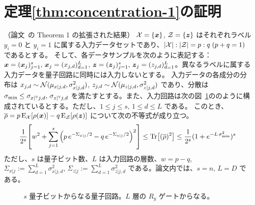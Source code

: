 \section{定理\ref{thm:concentration-1}の証明}\label{sec:prf-concentration-1}
\begin{screen}
    \begin{theorem}
        （論文~\cite{li2022concentration}の Theorem 1 の拡張された結果）
        $\mathcal{X} = \{\boldsymbol{x}\}$, $\mathcal{Z} = \{\boldsymbol{z}\}$ はそれぞれラベル $y_i=0$ と $y_i=1$ に属する入力データセットであり、$|\mathcal{X}|:|\mathcal{Z}| = p:q\;(p+q=1)$ であるとする。
        そして、各データサンプルを次のように表記する：$\boldsymbol{x} = (\boldsymbol{x}_{j})_{j=1}^s,\, \boldsymbol{x}_{j} = (x_{j,d})_{d=1}^L$, $\boldsymbol{z} = (\boldsymbol{z}_{j})_{j=1}^s,\, \boldsymbol{z}_{j} = (z_{j,d})_{d=1}^L$。異なるラベルに属する入力データを量子回路に同時には入力しないとする。
        入力データの各成分の分布は $x_{j,d} \sim \mathcal{N}(\mu_{x|j,d}, \sigma_{x|j,d}^2)$, $z_{j,d} \sim \mathcal{N}(\mu_{z|j,d}, \sigma_{z|j,d}^2)$ であり、分散は $\sigma_{\min} \leq \sigma_{x|{}^\forall j,d},\, \sigma_{z|{}^\forall j,d}$ を満たすとする。また、入力回路は次の図~\ref{fig:circuit-concentration-1_}ののように構成されているとする。ただし、$1\leq j\leq s,\, 1\leq d\leq L$ である。
        このとき、$\overline{\rho} = p\operatorname{E}_{\mathcal{X}}[\rho(\boldsymbol{x})] - q\operatorname{E}_{\mathcal{Z}}[\rho(\boldsymbol{z})]$ について次の不等式が成り立つ。
        \begin{align}
            \frac{1}{2^s}
            \qty[w^2 + \sum_{j=1}^s \qty(p\,e^{-\Sigma_{x|j}/2} - q\,e^{-\Sigma_{z|j}/2})^2]
            \leq \Tr[(\overline{\rho})^2]
            \leq \frac{1}{2^s} (1 + e^{-L\,\sigma_{\min}^2})^s
        \end{align}
        ただし、$s$ は量子ビット数、$L$ は入力回路の層数、$w = p - q$, $\Sigma_{x|j}:=\sum_{d=1}^L \sigma_{x|j,d}^2$, $\Sigma_{z|j}:=\sum_{d=1}^L \sigma_{z|j,d}^2$ である。論文内では、$s = n,\,L = D$ である。
    \end{theorem}
\end{screen}

\begin{figure}[H]
    \centering
    \caption{$s$ 量子ビットからなる量子回路。$L$ 層の $R_y$ ゲートからなる。}
    \label{fig:circuit-concentration-1_}
\end{figure}

